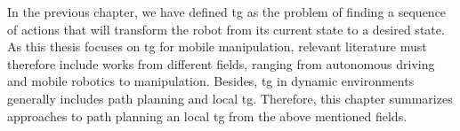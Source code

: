 In the previous chapter, we have defined \ac{tg} as the problem of finding a
sequence of actions that will transform the robot from its current state to a
desired state. As this thesis focuses on \ac{tg} for mobile manipulation,
relevant literature must therefore include works from different fields, ranging
from autonomous driving and mobile robotics to manipulation. Besides, \ac{tg} in
dynamic environments generally includes path planning and local \ac{tg}.
Therefore, this chapter summarizes approaches to path planning an local \ac{tg}
from the above mentioned fields.


